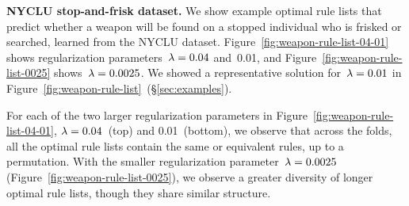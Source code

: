 \clearpage
\textbf{NYCLU stop-and-frisk dataset.}
We show example optimal rule lists that predict whether a weapon
will be found on a stopped individual who is frisked or searched, learned from the NYCLU dataset.
%
Figure~\ref{fig:weapon-rule-list-04-01} shows
regularization parameters~${{\lambda} = 0.04}$ and~0.01,
and Figure~\ref{fig:weapon-rule-list-0025} shows~${{\lambda} = 0.0025}$.
%
We showed a representative solution for~${{\lambda} = 0.01}$ in
Figure~\ref{fig:weapon-rule-list}~(\S\ref{sec:examples}).

For each of the two larger regularization parameters in Figure~\ref{fig:weapon-rule-list-04-01},
${{\lambda} = 0.04}$~(top) and 0.01~(bottom), we observe that across the folds,
all the optimal rule lists contain the same or equivalent rules, up to a permutation.
%
With the smaller regularization parameter~${{\lambda} = 0.0025}$ (Figure~\ref{fig:weapon-rule-list-0025}),
we observe a greater diversity of longer optimal rule lists, though they share similar structure.

